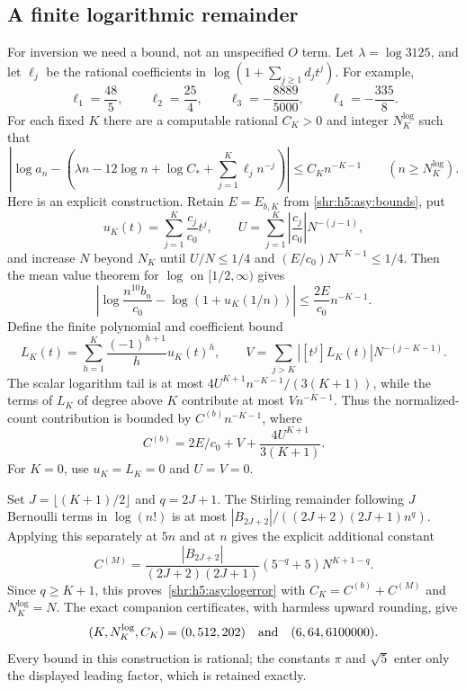 \documentclass[11pt,letterpaper]{article}
\numberwithin{equation}{section}
\theoremstyle{definition}
\newcommand{\1}{\mathbf 1}
\begin{document}
\subsection{A finite logarithmic remainder}
For inversion we need a bound, not an unspecified $O$ term. Let
$\lambda=\log3125$, and let $\ell_j$ be the rational coefficients in
$\log(1+\sum_{j\ge1}d_jt^j)$. For example,
\begin{equation}
 \ell_1=\frac{48}{5},\qquad \ell_2=\frac{25}{4},\qquad
 \ell_3=-\frac{8889}{5000},\qquad \ell_4=-\frac{335}{8}.
 \label{shr:h5:asy:logcoeffs}
\end{equation}
For each fixed $K$ there are a computable rational $C_K>0$ and integer
$N_K^{\log}$ such that
\begin{equation}
 \left|\log a_n-\left(\lambda n-12\log n+\log C_*
                         +\sum_{j=1}^K\ell_jn^{-j}\right)\right|
 \le C_Kn^{-K-1}\qquad(n\ge N_K^{\log}).
 \label{shr:h5:asy:logerror}
\end{equation}
Here is an explicit construction. Retain $E=E_{b,K}$ from
\eqref{shr:h5:asy:bounds}, put
\[
 u_K(t)=\sum_{j=1}^K\frac{c_j}{c_0}t^j,
 \qquad U=\sum_{j=1}^K\left|\frac{c_j}{c_0}\right|N^{-(j-1)},
\]
and increase $N$ beyond $N_K$ until
$U/N\le1/4$ and $(E/c_0)N^{-K-1}\le1/4$.
Then the mean value theorem for $\log$ on $[1/2,\infty)$ gives
\[
 \left|\log\frac{n^{10}b_n}{c_0}-\log(1+u_K(1/n))\right|
 \le\frac{2E}{c_0}n^{-K-1}.
\]
Define the finite polynomial and coefficient bound
\[
 L_K(t)=\sum_{h=1}^K\frac{(-1)^{h+1}}h u_K(t)^h,
 \qquad V=\sum_{j>K}|[t^j]L_K(t)|N^{-(j-K-1)}.
\]
The scalar logarithm tail is at most
$4U^{K+1}n^{-K-1}/(3(K+1))$, while the terms of $L_K$ of degree above
$K$ contribute at most $Vn^{-K-1}$. Thus the normalized-count contribution
is bounded by $C^{(b)}n^{-K-1}$, where
\[
 C^{(b)}=2E/c_0+V+\frac{4U^{K+1}}{3(K+1)}.
\]
For $K=0$, use $u_K=L_K=0$ and $U=V=0$.

Set $J=\lfloor(K+1)/2\rfloor$ and $q=2J+1$. The Stirling remainder
following $J$ Bernoulli terms in $\log(n!)$ is at most
$|B_{2J+2}|/((2J+2)(2J+1)n^q)$. Applying this separately at $5n$ and at
$n$ gives the explicit additional constant
\[
 C^{(M)}=\frac{|B_{2J+2}|}{(2J+2)(2J+1)}
              (5^{-q}+5)N^{K+1-q}.
\]
Since $q\ge K+1$, this proves~\eqref{shr:h5:asy:logerror} with
$C_K=C^{(b)}+C^{(M)}$ and $N_K^{\log}=N$.
The exact companion certificates, with harmless upward rounding, give
\begin{equation}
 (K,N_K^{\log},C_K)=(0,512,202)
 \quad\hbox{and}\quad (6,64,6100000).
 \label{shr:h5:asy:logexamples}
\end{equation}
Every bound in this construction is rational; the constants $\pi$ and
$\sqrt5$ enter only the displayed leading factor, which is retained exactly.
\end{document}
